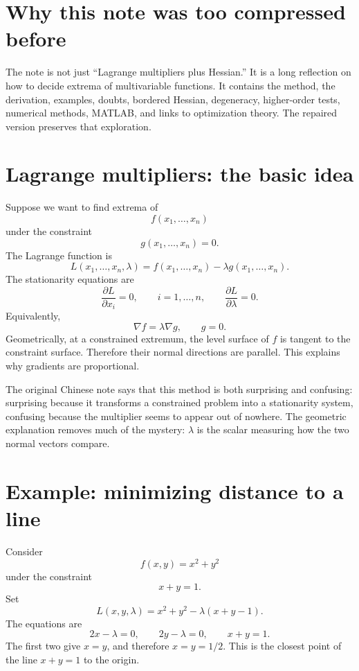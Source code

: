 
\section{Why this note was too compressed before}

The note is not just “Lagrange multipliers plus Hessian.”  It is a long reflection on how to decide extrema of multivariable functions.  It contains the method, the derivation, examples, doubts, bordered Hessian, degeneracy, higher-order tests, numerical methods, MATLAB, and links to optimization theory.  The repaired version preserves that exploration.

\section{Lagrange multipliers: the basic idea}

Suppose we want to find extrema of
\[
  f(x_1,\ldots,x_n)
\]
under the constraint
\[
  g(x_1,\ldots,x_n)=0.
\]
The Lagrange function is
\[
  L(x_1,\ldots,x_n,\lambda)
  =f(x_1,\ldots,x_n)-\lambda g(x_1,\ldots,x_n).
\]
The stationarity equations are
\[
  \frac{\partial L}{\partial x_i}=0,
  \qquad i=1,\ldots,n,
  \qquad
  \frac{\partial L}{\partial \lambda}=0.
\]
Equivalently,
\[
  \nabla f=\lambda \nabla g,
  \qquad
  g=0.
\]
Geometrically, at a constrained extremum, the level surface of $f$ is tangent to the constraint surface.  Therefore their normal directions are parallel.  This explains why gradients are proportional.

The original Chinese note says that this method is both surprising and confusing: surprising because it transforms a constrained problem into a stationarity system, confusing because the multiplier seems to appear out of nowhere.  The geometric explanation removes much of the mystery: $\lambda$ is the scalar measuring how the two normal vectors compare.

\section{Example: minimizing distance to a line}

Consider
\[
  f(x,y)=x^2+y^2
\]
under the constraint
\[
  x+y=1.
\]
Set
\[
  L(x,y,\lambda)=x^2+y^2-\lambda(x+y-1).
\]
The equations are
\[
  2x-\lambda=0,
  \qquad
  2y-\lambda=0,
  \qquad
  x+y=1.
\]
The first two give $x=y$, and therefore $x=y=1/2$.  This is the closest point of the line $x+y=1$ to the origin.

